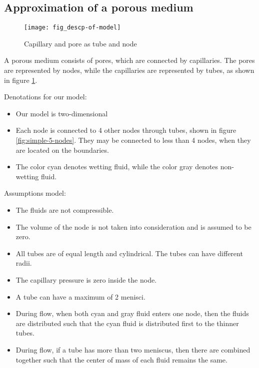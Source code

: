 \subsection{Approximation of a porous medium} \label{sec:approx-porous-medium}

	\begin{figure}[H]
		\centering
		\texttt{[image: fig\_descp-of-model]}
		\caption{Capillary and pore as tube and node}
		\label{fig:descp-of-model}
	\end{figure}
	
	A porous medium consists of pores, which are connected by capillaries. The pores are represented by nodes, while the capillaries are represented by tubes, as shown in figure \ref{fig:descp-of-model}.
	
	Denotations for our model:
	
	\begin{itemize}
		\item Our model is two-dimensional 
		\item Each node is connected to 4 other nodes through tubes, shown in figure \ref{fig:simple-5-nodes}. They may be connected to less than 4 nodes, when they are located on the boundaries.
		\item The color cyan denotes wetting fluid, while the color gray denotes non-wetting fluid.
	\end{itemize}
	
	Assumptions model:
	
	\begin{itemize}
		\item The fluids are not compressible.
		\item The volume of the node is not taken into consideration and is assumed to be zero.
		\item All tubes are of equal length and cylindrical. The tubes can have different radii.
		\item The capillary pressure is zero inside the node.
		\item A tube can have a maximum of 2 menisci.
		\item During flow, when both cyan and gray fluid enters one node, then the fluids are distributed such that the cyan fluid is distributed first to the thinner tubes.
		\item During flow, if a tube has more than two meniscus, then there are combined together such that the center of mass of each fluid remains the same.
	\end{itemize}
	
